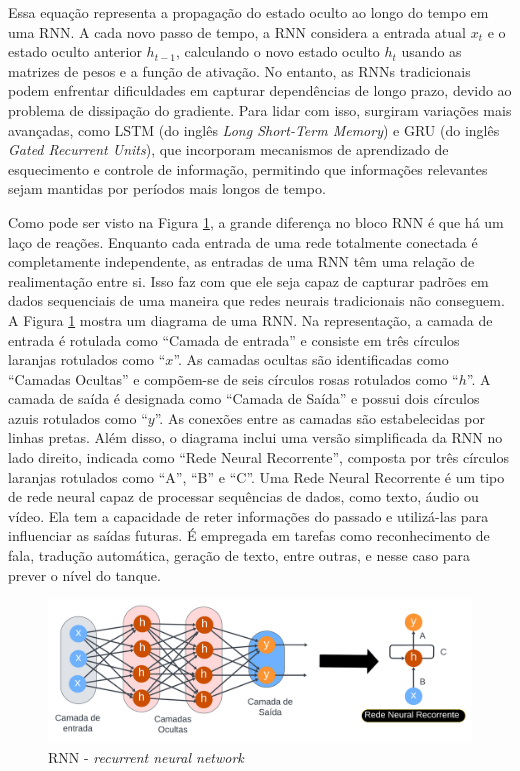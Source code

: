 Essa equação representa a propagação do estado oculto ao longo do tempo em uma RNN. A cada novo passo de tempo, a RNN considera a entrada atual \( x_t \) e o estado oculto anterior \( h_{t-1} \), calculando o novo estado oculto \( h_t \) usando as matrizes de pesos e a função de ativação.
No entanto, as RNNs tradicionais podem enfrentar dificuldades em capturar dependências de longo prazo, devido ao problema de dissipação do gradiente. Para lidar com isso, surgiram variações mais avançadas, como LSTM (do inglês \textit{Long Short-Term Memory})  e GRU (do inglês \textit{Gated Recurrent Units}), que incorporam mecanismos de aprendizado de esquecimento e controle de informação, permitindo que informações relevantes sejam mantidas por períodos mais longos de tempo.

Como pode ser visto na Figura \ref{fig:rnn1}, a grande diferença no bloco RNN é que há um laço de reações. Enquanto cada entrada de uma rede totalmente conectada é completamente independente, as entradas de uma RNN têm uma relação de realimentação entre si. Isso faz com que ele seja capaz de capturar padrões em dados sequenciais de uma maneira que redes neurais tradicionais não conseguem.
A Figura \ref{fig:rnn1} mostra um diagrama de uma RNN. Na representação, a camada de entrada é rotulada como ``Camada de entrada'' e consiste em três círculos laranjas rotulados como ``$x$''. As camadas ocultas são identificadas como ``Camadas Ocultas'' e compõem-se de seis círculos rosas rotulados como ``$h$''. A camada de saída é designada como ``Camada de Saída'' e possui dois círculos azuis rotulados como ``$y$''. As conexões entre as camadas são estabelecidas por linhas pretas. Além disso, o diagrama inclui uma versão simplificada da RNN no lado direito, indicada como ``Rede Neural Recorrente'', composta por três círculos laranjas rotulados como ``A'', ``B'' e ``C''.
Uma Rede Neural Recorrente é um tipo de rede neural capaz de processar sequências de dados, como texto, áudio ou vídeo. Ela tem a capacidade de reter informações do passado e utilizá-las para influenciar as saídas futuras. É empregada em tarefas como reconhecimento de fala, tradução automática, geração de texto, entre outras, e nesse caso para prever o nível do tanque.



\begin{figure}[H]
	\centering
	\caption{RNN - \textit{recurrent neural network}}
	\label{fig:rnn1}
	\includegraphics[width=1\linewidth]{Apendices/Figuras/modelagem-24h/rnn1}
	
\end{figure}


